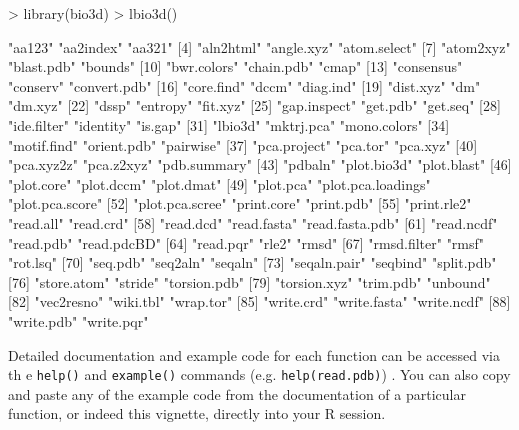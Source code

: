\documentclass[letter]{article}
\begin{document}
\begin{Schunk}
\begin{Sinput}
> library(bio3d)
> lbio3d()
\end{Sinput}
\begin{Soutput}
 [1] "aa123"             "aa2index"          "aa321"            
 [4] "aln2html"          "angle.xyz"         "atom.select"      
 [7] "atom2xyz"          "blast.pdb"         "bounds"           
[10] "bwr.colors"        "chain.pdb"         "cmap"             
[13] "consensus"         "conserv"           "convert.pdb"      
[16] "core.find"         "dccm"              "diag.ind"         
[19] "dist.xyz"          "dm"                "dm.xyz"           
[22] "dssp"              "entropy"           "fit.xyz"          
[25] "gap.inspect"       "get.pdb"           "get.seq"          
[28] "ide.filter"        "identity"          "is.gap"           
[31] "lbio3d"            "mktrj.pca"         "mono.colors"      
[34] "motif.find"        "orient.pdb"        "pairwise"         
[37] "pca.project"       "pca.tor"           "pca.xyz"          
[40] "pca.xyz2z"         "pca.z2xyz"         "pdb.summary"      
[43] "pdbaln"            "plot.bio3d"        "plot.blast"       
[46] "plot.core"         "plot.dccm"         "plot.dmat"        
[49] "plot.pca"          "plot.pca.loadings" "plot.pca.score"   
[52] "plot.pca.scree"    "print.core"        "print.pdb"        
[55] "print.rle2"        "read.all"          "read.crd"         
[58] "read.dcd"          "read.fasta"        "read.fasta.pdb"   
[61] "read.ncdf"         "read.pdb"          "read.pdcBD"       
[64] "read.pqr"          "rle2"              "rmsd"             
[67] "rmsd.filter"       "rmsf"              "rot.lsq"          
[70] "seq.pdb"           "seq2aln"           "seqaln"           
[73] "seqaln.pair"       "seqbind"           "split.pdb"        
[76] "store.atom"        "stride"            "torsion.pdb"      
[79] "torsion.xyz"       "trim.pdb"          "unbound"          
[82] "vec2resno"         "wiki.tbl"          "wrap.tor"         
[85] "write.crd"         "write.fasta"       "write.ncdf"       
[88] "write.pdb"         "write.pqr"        
\end{Soutput}
\end{Schunk}
Detailed documentation and example code for each function can be accessed via th
e \texttt{help()} and \texttt{example()} commands (e.g. \texttt{help(read.pdb)})
.  You can also copy and paste any of the example code from the documentation of
 a particular function, or indeed this vignette, directly into your R session.
\end{document}
